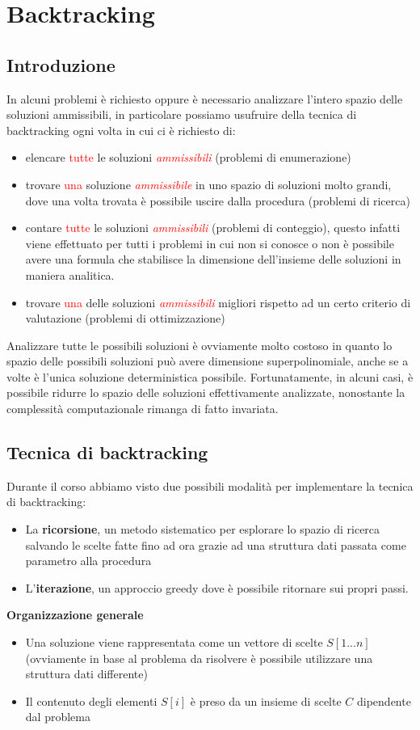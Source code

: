 \documentclass[../cheatSheetAlgoritmi.tex]{subfiles}
\begin{document}
\chapter{Backtracking}
\section{Introduzione}
In alcuni problemi è richiesto oppure è necessario analizzare l'intero spazio delle soluzioni ammissibili, in particolare possiamo usufruire della tecnica di backtracking ogni volta in cui ci è richiesto di:
\begin{itemize}
	\item elencare \textcolor{red}{tutte} le soluzioni \textcolor{red}{\emph{ammissibili}} (problemi di enumerazione)
	\item trovare  \textcolor{red}{una} soluzione \textcolor{red}{\emph{ammissibile}} in uno spazio di soluzioni molto grandi, dove una volta trovata è possibile uscire dalla procedura (problemi di ricerca)
	\item contare  \textcolor{red}{tutte} le soluzioni \textcolor{red}{\emph{ammissibili}} (problemi di conteggio), questo infatti viene effettuato per tutti i problemi in cui non si conosce o non è possibile avere una formula che stabilisce la dimensione dell'insieme delle soluzioni in maniera analitica.
	\item trovare \textcolor{red}{una} delle soluzioni \textcolor{red}{\emph{ammissibili}} migliori rispetto ad un certo criterio di valutazione (problemi di ottimizzazione)
\end{itemize}
Analizzare tutte le possibili soluzioni è ovviamente molto costoso in quanto lo spazio delle possibili soluzioni può avere dimensione superpolinomiale, anche se a volte è l'unica soluzione deterministica possibile. Fortunatamente, in alcuni casi, è possibile ridurre lo spazio delle soluzioni effettivamente analizzate, nonostante la complessità computazionale rimanga di fatto invariata. 

\section{Tecnica di backtracking}
Durante il corso abbiamo visto due possibili modalità per implementare la tecnica di backtracking: 
\begin{itemize}
	\item La \textbf{ricorsione}, un metodo sistematico per esplorare lo spazio di ricerca salvando le scelte fatte fino ad ora grazie ad una struttura dati passata come parametro alla procedura
	\item L'\textbf{iterazione}, un approccio greedy dove è possibile ritornare sui propri passi.
\end{itemize}
\textbf{Organizzazione generale} 
\begin{itemize}
	\item Una soluzione viene rappresentata come un vettore di scelte $S[1...n]$ (ovviamente in base al problema da risolvere è possibile utilizzare una struttura dati differente)
	\item Il contenuto degli elementi $S[i]$ è preso da un insieme di scelte $C$ dipendente dal problema
\end{itemize}
\end{document}
